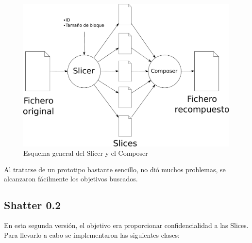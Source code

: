 \begin{figure}[ht]
  \centering
  \includegraphics[scale=0.5]{Figures/Assembler}
  \decoRule
  \caption[Slicer - Composer]{Esquema general del Slicer y el Composer}
  \label{fig:Assembler}
\end{figure}

Al tratarse de un prototipo bastante sencillo, no dió muchos problemas, se
alcanzaron fácilmente los objetivos buscados.

\subsection{Shatter 0.2}

En esta segunda versión, el objetivo era proporcionar confidencialidad a las
Slices. Para llevarlo a cabo se implementaron las siguientes clases:

